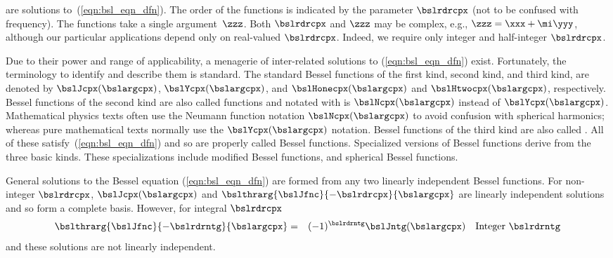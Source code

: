 \documentclass[12pt]{article}
\begin{document}
 are solutions to~(\ref{eqn:bsl_eqn_dfn}).
The order of the functions is indicated by the parameter $\bslrdrcpx$
(not to be confused with frequency). 
The functions take a single argument~$\zzz$.
Both $\bslrdrcpx$ and $\zzz$ may be complex, e.g., 
$\zzz = \xxx + \mi\yyy$, although our particular applications depend
only on real-valued $\bslrdrcpx$.
Indeed, we require only integer and half-integer $\bslrdrcpx$.

Due to their power and range of applicability, a menagerie of
inter-related solutions to (\ref{eqn:bsl_eqn_dfn}) exist.
Fortunately, the terminology to identify and describe them is
standard.
The standard Bessel functions of the first kind, second kind,
and third kind, are denoted by $\bslJcpx(\bslargcpx)$, 
$\bslYcpx(\bslargcpx)$, and 
$\bslHonecpx(\bslargcpx)$ and $\bslHtwocpx(\bslargcpx)$, respectively.   
Bessel functions of the second kind are also called 
functions and notated with is $\bslNcpx(\bslargcpx)$ instead of 
$\bslYcpx(\bslargcpx)$.
Mathematical physics texts often use the Neumann function notation
$\bslNcpx(\bslargcpx)$ to avoid confusion with spherical harmonics;
whereas pure mathematical texts normally use the
$\bslYcpx(\bslargcpx)$ notation.
Bessel functions of the third kind are also called 
.
All of these satisfy~(\ref{eqn:bsl_eqn_dfn}) and so are properly 
called Bessel functions.
Specialized versions of Bessel functions derive from the three basic
kinds. 
These specializations include modified Bessel functions, and spherical
Bessel functions.

General solutions to the Bessel equation (\ref{eqn:bsl_eqn_dfn}) are
formed from any two linearly independent Bessel functions.
For non-integer $\bslrdrcpx$,
$\bslJcpx(\bslargcpx)$ and 
$\bslthrarg{\bslJfnc}{-\bslrdrcpx}{\bslargcpx}$ 
are linearly independent solutions and so form a complete basis.
However, for integral $\bslrdrcpx$
\begin{eqnarray}
\bslthrarg{\bslJfnc}{-\bslrdrntg}{\bslargcpx} 
 & = & (-1)^{\bslrdrntg} \bslJntg(\bslargcpx) \quad {\mbox{Integer}\ \bslrdrntg}
\label{eqn:bsl_sym_dfn}
\end{eqnarray}
and these solutions are not linearly independent.
\end{document}
